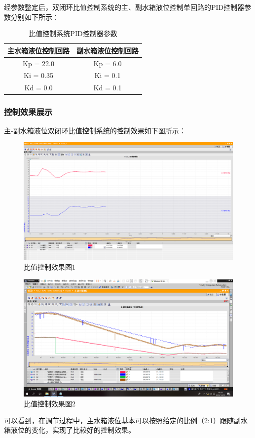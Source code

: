 \documentclass[UTF8]{article}
\begin{document}
经参数整定后，双闭环比值控制系统的主、副水箱液位控制单回路的PID控制器参数分别如下所示：
\begin{table}[H] %
\centering %
\begin{tabular}{cc} %
	\toprule %
	主水箱液位控制回路 & 副水箱液位控制回路 \\
	\midrule %
	Kp = 22.0 &  Kp = 6.0\\
	Ki = 0.35 & Ki = 0.1 \\
	Kd = 0.0 & Kd = 0.1 \\
	\bottomrule %
\end{tabular}
\caption{比值控制系统PID控制器参数} %
\end{table}

\subsubsection{控制效果展示}
主-副水箱液位双闭环比值控制系统的控制效果如下图所示：
\begin{figure}[H]
    \centering %
    \includegraphics[width=1\textwidth]{figure/比值控制效果1.png} 
    \caption{比值控制效果图1} %
\end{figure}
\begin{figure}[H]
    \centering %
    \includegraphics[width=1\textwidth]{figure/比值控制效果2.png} 
    \caption{比值控制效果图2} %
\end{figure}
可以看到，在调节过程中，主水箱液位基本可以按照给定的比例（2:1）跟随副水箱液位的变化，实现了比较好的控制效果。
\end{document}
